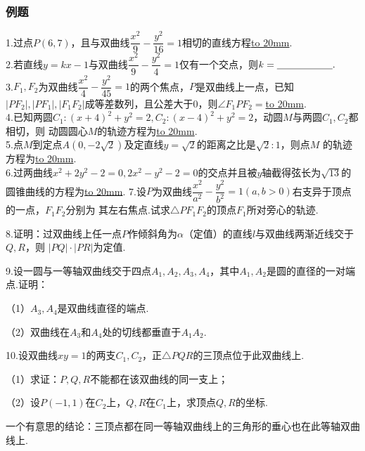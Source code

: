 \subsubsection{例题}
1.过点$P(6,7)$，且与双曲线$\dfrac{x^2}{9}-\dfrac{y^2}{16}=1$相切的直线方程\underline{\hbox to 20mm{}}.
~\\

2.若直线$y=kx-1$与双曲线$\dfrac{x^2}{9}-\dfrac{y^2}{4}=1$仅有一个交点，则$k=\underline{\hbox to 20mm{}}.$
~\\

3.$F_1,F_2$为双曲线$\dfrac{x^2}{4}-\dfrac{y^2}{45}=1$的两个焦点，$P$是双曲线上一点，已知
$|PF_2|,|PF_1|,|F_1F_2|$成等差数列，且公差大于0，则$\angle F_1PF_2=$\underline{\hbox to 20mm{}}.
~\\

4.已知两圆$C_1:(x+4)^2+y^2=2,C_2:(x-4)^2+y^2=2$，动圆$M$与两圆$C_1,C_2$都相切，则
动圆圆心$M$的轨迹方程为\underline{\hbox to 20mm{}}.
~\\

5.点$M$到定点$A(0,-2\sqrt{2})$及定直线$y=\sqrt{2}$的距离之比是$\sqrt{2}:1$，则点$M$
的轨迹方程为\underline{\hbox to 20mm{}}.
~\\

6.过两曲线$x^2+2y^2-2=0,2x^2-y^2-2=0$的交点并且被$y$轴截得弦长为$\sqrt{13}$的圆锥曲线的方程为\underline{\hbox to 20mm{}}.
\newpage
7.设$P$为双曲线$\dfrac{x^2}{a^2}-\dfrac{y^2}{b^2}=1(a,b>0)$右支异于顶点的一点，$F_1F_2$分别为
其左右焦点.试求$\bigtriangleup PF_1F_2$的顶点$F_1$所对旁心的轨迹.
\vspace{40mm}

8.证明：过双曲线上任一点$P$作倾斜角为$\alpha$（定值）的直线$l$与双曲线两渐近线交于$Q,R$，则
$|PQ|\cdot |PR|$为定值.
\vspace{40mm}

9.设一圆与一等轴双曲线交于四点$A_1,A_2,A_3,A_4$，其中$A_1,A_2$是圆的直径的一对端点.证明：

（1）$A_3,A_4$是双曲线直径的端点.

（2）双曲线在$A_3$和$A_4$处的切线都垂直于$A_1A_2$.
\vspace{50mm}

10.设双曲线$xy=1$的两支$C_1,C_2$，正$\bigtriangleup PQR$的三顶点位于此双曲线上.

（1）求证：$P,Q,R$不能都在该双曲线的同一支上；

（2）设$P(-1,1)$在$C_2$上，$Q,R$在$C_1$上，求顶点$Q,R$的坐标.

一个有意思的结论：三顶点都在同一等轴双曲线上的三角形的垂心也在此等轴双曲线上.
\newpage

